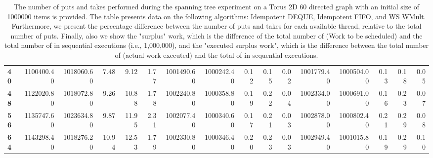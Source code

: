 \begin{table}[!ht]
{\begin{tabular}{lrrrrrrrrrrrrrrr}
\textbf{40} &       1100400.40 & 1018060.60 &           7.48 &        9.12 &                 1.77 &      1001490.60 & 1000242.40 &           0.12 &        0.15 &                 0.02 & 1001779.40 & 1000504.00 &           0.13 &        0.18 &                 0.05 \\
\textbf{48} &       1122020.80 & 1018072.80 &           9.26 &       10.88 &                 1.78 &      1002240.80 & 1000358.80 &           0.19 &        0.22 &                 0.04 & 1002334.00 & 1000691.00 &           0.16 &        0.23 &                 0.07 \\
\textbf{56} &       1135747.60 & 1023634.80 &           9.87 &       11.95 &                 2.31 &      1002077.40 & 1000340.60 &           0.17 &        0.21 &                 0.03 & 1002878.00 & 1000802.40 &           0.21 &        0.29 &                 0.08 \\
\textbf{64} &       1143298.40 & 1018276.20 &          10.94 &       12.53 &                 1.79 &      1002330.80 & 1000346.40 &           0.20 &        0.23 &                 0.03 & 1002949.40 & 1001015.80 &           0.19 &        0.29 &                 0.10 \\
\bottomrule
\end{tabular}}
\label{difference-Torus_2D_60_directed-1000000-IDEMPOTENT_DEQUE-IDEMPOTENT_FIFO-WS_NC_MULT_OPT}
\caption{The number of puts and takes performed during the
    spanning tree experiment on a Torus 2D 60 directed graph with an initial size
    of 1000000 items is provided. The table presents data on the
    following algorithms: Idempotent DEQUE, Idempotent FIFO, and
    WS WMult. Furthermore, we present the percentage difference
    between the number of puts and takes for each available thread,
    relative to the total number of puts. Finally, also we show the
    "surplus" work, which is the difference of the total number of
    \Puts (Work to be scheduled) and the total number of \Puts in
    sequential executions (i.e., 1,000,000), and the "executed surplus
    work", which is the difference between the total number of \Takes
    (actual work executed) and the total of \Takes in sequential
    executions.}
\end{table}
